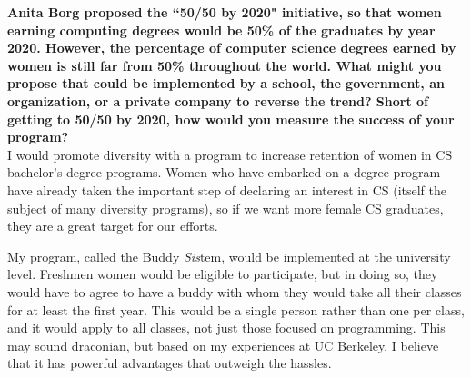 \documentclass{article}
\begin{document}
	
\pagestyle{plain}

\textbf{Anita Borg proposed the ``50/50 by 2020" initiative, so that women earning computing degrees would be 50\% of the graduates by year 2020. However, the percentage of computer science degrees earned by women is still far from 50\% throughout the world.  What might you propose that could be implemented by a school, the government, an organization, or a private company to reverse the trend? Short of getting to 50/50 by 2020, how would you measure the success of your program?}\\

I would promote diversity with a program to increase retention of women in CS bachelor's degree programs.
Women who have embarked on a degree program have already taken the important step of declaring an interest in CS (itself the subject of many diversity programs), so if we want more female CS graduates, they are a great target for our efforts.  %

My program, called the Buddy \textit{Sis}tem, would be implemented at the university level.
Freshmen women would be eligible to participate, but in doing so, they would have to agree to have a buddy with whom they would take all their classes for at least the first year.
This would be a single person rather than one per class, and it would apply to all classes, not just those focused on programming.
This may sound draconian, but based on my experiences at UC Berkeley, I believe that it has powerful advantages that outweigh the hassles.
\end{document}
